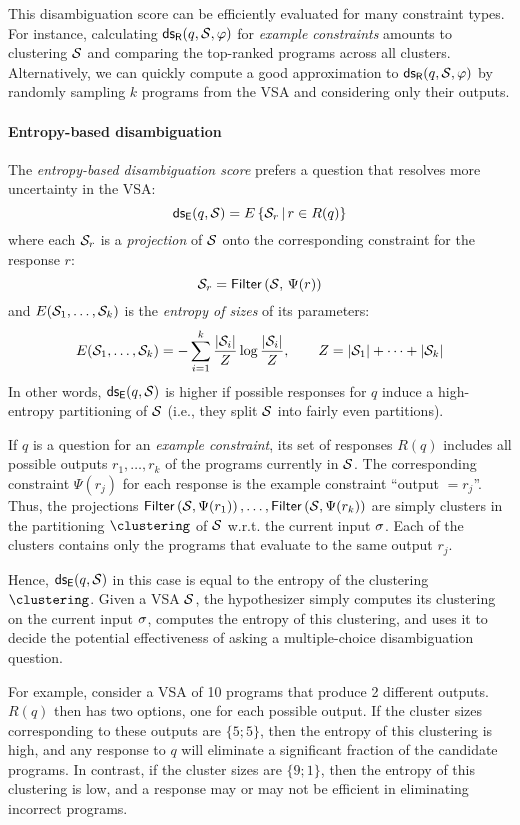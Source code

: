 This disambiguation score can be efficiently evaluated for many constraint types.
For instance, calculating $\mathsf{ds_R}(q , \mathcal{S}, \varphi)$ for \emph{example constraints} amounts to clustering $\mathcal{S}$
and comparing the top-ranked programs across all clusters.
Alternatively, we can quickly compute a good approximation to $\mathsf{ds_R}(q , \mathcal{S}, \varphi)$ by randomly sampling $k$
programs from the VSA and considering only their outputs.

\paragraph{Entropy-based disambiguation}
The \emph{entropy-based disambiguation score} prefers a question that resolves more uncertainty in the VSA:
\[
    \mathsf{ds_E}(q , \mathcal{S}) = E \left\{ \mathcal{S}_r \,\middle|\, r \in R(q) \right\}
\]
where each $\mathcal{S}_r$ is a \emph{projection} of $\mathcal{S}$ onto the corresponding constraint for the response $r$:
\[
    \mathcal{S}_r = \mathsf{Filter}\left(\mathcal{S},\, \Psi(r)\right)
\]
and $E(\mathcal{S}_1, \dots, \mathcal{S}_k)$ is the \emph{entropy of sizes} of its parameters:
\[
    E(\mathcal{S}_1, \dots, \mathcal{S}_k) = - \sum_{i=1}^k \frac{|\mathcal{S}_i|}{Z} \log \frac{|\mathcal{S}_i|}{Z}, \qquad
    Z = |\mathcal{S}_1| + \dots + |\mathcal{S}_k|
\]
In other words, $\mathsf{ds_E}(q , \mathcal{S})$ is higher if possible responses for $q$ induce a high-entropy partitioning of
$\mathcal{S}$ (i.e., they split $\mathcal{S}$ into fairly even partitions).

\begin{example}
    If $q$ is a question for an \emph{example constraint}, its set of responses $R(q)$ includes all possible outputs
    $r_1, \dots, r_k$ of the programs currently in $\mathcal{S}$.
    The corresponding constraint $\Psi(r_j)$ for each response is the example constraint ``output $= r_j$''.
    Thus, the projections $\mathsf{Filter}\left(\mathcal{S}, \Psi(r_1)\right), \dots, \mathsf{Filter}\left(\mathcal{S},
    \Psi(r_k)\right)$ are simply clusters in the partitioning $\clustering$ of $\mathcal{S}$ w.r.t. the current input $\sigma$.
    Each of the clusters contains only the programs that evaluate to the same output $r_j$.

    Hence, $\mathsf{ds_E}(q , \mathcal{S})$ in this case is equal to the entropy of the clustering $\clustering$.
    Given a VSA $\mathcal{S}$, the hypothesizer simply computes its clustering on the current input $\sigma$, computes the
    entropy of this clustering, and uses it to decide the potential effectiveness of asking a multiple-choice
    disambiguation question.

    For example, consider a VSA of 10 programs that produce 2 different outputs.
    $R(q)$ then has two options, one for each possible output.
    If the cluster sizes corresponding to these outputs are $\{5; 5\}$, then the entropy of this clustering is high, and
    any response to $q$ will eliminate a significant fraction of the candidate programs.
    In contrast, if the cluster sizes are $\{9; 1\}$, then the entropy of this clustering is low, and a response may or
    may not be efficient in eliminating incorrect programs.
\end{example}

